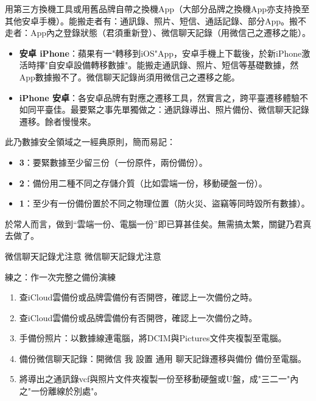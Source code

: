 
用第三方換機工具或用舊品牌自帶之換機App（大部分品牌之換機App亦支持換至其他安卓手機）。能搬走者有：通訊錄、照片、短信、通話記錄、部分App。搬不走者：App內之登錄狀態（君須重新登）、微信聊天記錄（用微信己之遷移之能）。


\begin{itemize}
  \item \textbf{安卓 iPhone}：蘋果有一"轉移到iOS"App，安卓手機上下載後，於新iPhone激活時擇"自安卓設備轉移數據"。能搬走通訊錄、照片、短信等基礎數據，然App數據搬不了。微信聊天記錄尚須用微信己之遷移之能。
  \item \textbf{iPhone 安卓}：各安卓品牌有對應之遷移工具，然實言之，跨平臺遷移體驗不如同平臺佳。最要緊之事先單獨做之：通訊錄導出、照片備份、微信聊天記錄遷移。餘者慢慢來。
\end{itemize}


此乃數據安全領域之一經典原則，簡而易記：

\begin{itemize}
  \item \textbf{3}：要緊數據至少留三份（一份原件，兩份備份）。
  \item \textbf{2}：備份用二種不同之存儲介質（比如雲端一份，移動硬盤一份）。
  \item \textbf{1}：至少有一份備份置於不同之物理位置（防火災、盜竊等同時毀所有數據）。
\end{itemize}

於常人而言，做到“雲端一份、電腦一份”即已算甚佳矣。無需搞太繁，關鍵乃君真去做了。

\begin{tcbwarn}{微信聊天記錄尤注意}
微信聊天記錄尤注意

\end{tcbwarn}

\begin{tcbpractice}{練之：作一次完整之備份演練}
\begin{enumerate}
  \item 查iCloud雲備份或品牌雲備份有否開啓，確認上一次備份之時。
  \item 查iCloud雲備份或品牌雲備份有否開啓，確認上一次備份之時。
  \item 手備份照片：以數據線連電腦，將DCIM與Pictures文件夾複製至電腦。
  \item 備份微信聊天記錄：開微信 我 設置 通用 聊天記錄遷移與備份 備份至電腦。
  \item 將導出之通訊錄vcf與照片文件夾複製一份至移動硬盤或U盤，成"三二一"內之"一份離線於別處"。
\end{enumerate}

\end{tcbpractice}
